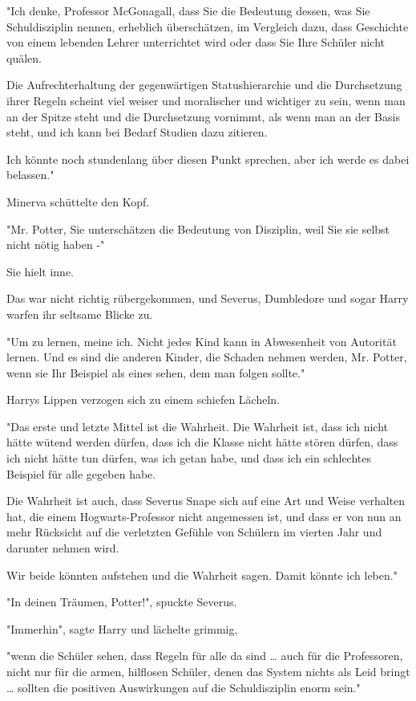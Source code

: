 {"Ich denke, Professor McGonagall, dass Sie die Bedeutung dessen, was Sie Schuldisziplin nennen, erheblich überschätzen, im Vergleich dazu, dass Geschichte von einem lebenden Lehrer unterrichtet wird oder dass Sie Ihre Schüler nicht quälen.

Die Aufrechterhaltung der gegenwärtigen Statushierarchie und die Durchsetzung ihrer Regeln scheint viel weiser und moralischer und wichtiger zu sein, wenn man an der Spitze steht und die Durchsetzung vornimmt, als wenn man an der Basis steht, und ich kann bei Bedarf Studien dazu zitieren.

Ich könnte noch stundenlang über diesen Punkt sprechen, aber ich werde es dabei belassen."

Minerva schüttelte den Kopf.

"Mr. Potter, Sie unterschätzen die Bedeutung von Disziplin, weil Sie sie selbst nicht nötig haben -"

Sie hielt inne.

Das war nicht richtig rübergekommen, und Severus, Dumbledore und sogar Harry warfen ihr seltsame Blicke zu.

"Um zu lernen, meine ich. Nicht jedes Kind kann in Abwesenheit von Autorität lernen. Und es sind die anderen Kinder, die Schaden nehmen werden, Mr. Potter, wenn sie Ihr Beispiel als eines sehen, dem man folgen sollte."

Harrys Lippen verzogen sich zu einem schiefen Lächeln.

"Das erste und letzte Mittel ist die Wahrheit. Die Wahrheit ist, dass ich nicht hätte wütend werden dürfen, dass ich die Klasse nicht hätte stören dürfen, dass ich nicht hätte tun dürfen, was ich getan habe, und dass ich ein schlechtes Beispiel für alle gegeben habe.

Die Wahrheit ist auch, dass Severus Snape sich auf eine Art und Weise verhalten hat, die einem Hogwarts-Professor nicht angemessen ist, und dass er von nun an mehr Rücksicht auf die verletzten Gefühle von Schülern im vierten Jahr und darunter nehmen wird.

Wir beide könnten aufstehen und die Wahrheit sagen. Damit könnte ich leben."

"In deinen Träumen, Potter!", spuckte Severus.

"Immerhin", sagte Harry und lächelte grimmig,

"wenn die Schüler sehen, dass Regeln für alle da sind … auch für die Professoren, nicht nur für die armen, hilflosen Schüler, denen das System nichts als Leid bringt … sollten die positiven Auswirkungen auf die Schuldisziplin enorm sein."

}
